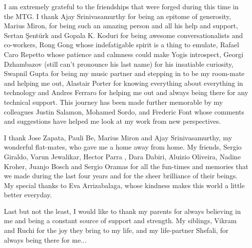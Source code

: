 I am extremely grateful to the friendships that were forged during this time in the MTG. I thank Ajay Srinivasamurthy for being an epitome of generosity, Marius Miron, for being such an amazing person and all his help and support, Sertan \c{S}ent{\"u}rk and Gopala K. Koduri for being awesome conversationalists and co-workers, Rong Gong whose indefatigable spirit is a thing to emulate, Rafael Caro Repetto whose patience and calmness could make Yogis introspect, Georgi Dzhambazov (still can't pronounce his last name) for his insatiable curiosity, Swapnil Gupta for being my music partner and stepping in to be my room-mate and helping me out, Alastair Porter for knowing everything about everything in technology and Andres Ferraro for helping me out and always being there for any technical support. This journey has been made further memorable by my colleagues Justin Salamon, Mohamed Sordo, and Frederic Font whose comments and suggestions have helped me look at my work from new perspectives. 

I thank Jose Zapata, Pauli Be, Marius Miron and Ajay Srinivasamurthy, my wonderful flat-mates, who gave me a home away from home. My friends, Sergio Giraldo, Varun Jewalikar, Hector Parra , Dara Dabiri, Aluizio Oliveira, Nadine Kroher, Juanjo Bosch and Sergio Oramas for all the fun-times and memories that we made during the last four years and for the sheer brilliance of their beings. My special thanks to Eva Arrizabalaga, whose kindness makes this world a little better everyday.

Last but not the least, I would like to thank my parents for always believing in me and being a constant source of support and strength. My siblings, Vikram and Ruchi for the joy they bring to my life, and my life-partner Shefali, for always being there for me...


%
%
\normalsize